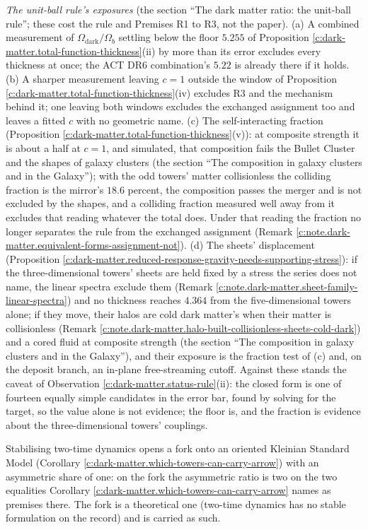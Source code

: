 \documentclass[11pt]{article}
\theoremstyle{definition}
\theoremstyle{plain}
\begin{document}
\emph{The unit-ball rule's exposures} (the section ``The dark matter ratio: the unit-ball rule''; these cost the rule and Premises R1 to R3, not the paper). (a) A combined measurement of $\Omega_{\mathrm{dark}}/\Omega_{b}$ settling below the floor $5.255$ of Proposition \ref{c:dark-matter.total-function-thickness}(ii) by more than its error excludes every thickness at once; the ACT DR6 combination's $5.22$ is already there if it holds. (b) A sharper measurement leaving $c = 1$ outside the window of Proposition \ref{c:dark-matter.total-function-thickness}(iv) excludes R3 and the mechanism behind it; one leaving both windows excludes the exchanged assignment too and leaves a fitted $c$ with no geometric name. (c) The self-interacting fraction (Proposition \ref{c:dark-matter.total-function-thickness}(v)): at composite strength it is about a half at $c = 1$, and simulated, that composition fails the Bullet Cluster and the shapes of galaxy clusters (the section ``The composition in galaxy clusters and in the Galaxy''); with the odd towers' matter collisionless the colliding fraction is the mirror's $18.6$ percent, the composition passes the merger and is not excluded by the shapes, and a colliding fraction measured well away from it excludes that reading whatever the total does. Under that reading the fraction no longer separates the rule from the exchanged assignment (Remark \ref{c:note.dark-matter.equivalent-forms-assignment-not}). (d) The sheets' displacement (Proposition \ref{c:dark-matter.reduced-response-gravity-needs-supporting-stress}): if the three-dimensional towers' sheets are held fixed by a stress the series does not name, the linear spectra exclude them (Remark \ref{c:note.dark-matter.sheet-family-linear-spectra}) and no thickness reaches $4.364$ from the five-dimensional towers alone; if they move, their halos are cold dark matter's when their matter is collisionless (Remark \ref{c:note.dark-matter.halo-built-collisionless-sheets-cold-dark}) and a cored fluid at composite strength (the section ``The composition in galaxy clusters and in the Galaxy''), and their exposure is the fraction test of (c) and, on the deposit branch, an in-plane free-streaming cutoff. Against these stands the caveat of Observation \ref{c:dark-matter.status-rule}(ii): the closed form is one of fourteen equally simple candidates in the error bar, found by solving for the target, so the value alone is not evidence; the floor is, and the fraction is evidence about the three-dimensional towers' couplings.

Stabilising two-time dynamics opens a fork onto an oriented Kleinian Standard Model (Corollary \ref{c:dark-matter.which-towers-can-carry-arrow}) with an asymmetric share of one: on the fork the asymmetric ratio is two on the two equalities Corollary \ref{c:dark-matter.which-towers-can-carry-arrow} names as premises there. The fork is a theoretical one (two-time dynamics has no stable formulation on the record) and is carried as such.
\end{document}
